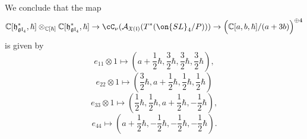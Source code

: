 \documentclass[12pt]{amsart}
\begin{document}
We conclude that the map
\begin{equation}\label{comp_RHS_HN}
\mathbb{C}[\mathfrak{h}^*_{\mathfrak{gl}_4},\hbar] \otimes_{\mathbb{C}[\hbar]} \mathbb{C}[\mathfrak{h}^*_{\mathfrak{gl}_4},\hbar] \rightarrow \cC_\nu(\mathcal{A}_{\mathfrak{X}(\mathfrak{l})}(T^*(\on{SL}_4/P))) \rightarrow \Big(\mathbb{C}[a,b,\hbar]/(a+3b)\Big)^{\oplus 4}
\end{equation}
is given by 
\begin{equation*}
e_{11} \otimes 1 \mapsto (a+\frac{1}{2}\hbar,\frac{3}{2}\hbar,\frac{3}{2}\hbar,\frac{3}{2}\hbar),
\end{equation*}
\begin{equation*}
e_{22} \otimes 1 \mapsto (\frac{3}{2}\hbar,a+\frac{1}{2}\hbar,\frac{1}{2}\hbar,\frac{1}{2}\hbar)
\end{equation*}
\begin{equation*}
e_{33} \otimes 1 \mapsto (\frac{1}{2}\hbar,\frac{1}{2}\hbar,a+\frac{1}{2}\hbar,-\frac{1}{2}\hbar),
\end{equation*}
\begin{equation*}
e_{44} \mapsto (a+\frac{1}{2}\hbar,-\frac{1}{2}\hbar,-\frac{1}{2}\hbar,-\frac{1}{2}\hbar).
\end{equation*}

\end{document}

